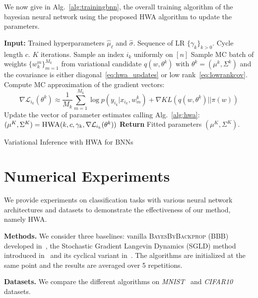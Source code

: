 \documentclass[tablecaption=bottom,wcp]{jmlr}
\begin{document}
We now give in Alg.~\ref{alg:trainingbnn}, the overall training algorithm of the bayesian neural network using the proposed HWA algorithm to update the parameters.
\begin{algorithm}[H]
\begin{algorithmic}[1]
\STATE \textbf{Input:} Trained hyperparameters $\hat{\mu}_{\ell}$ and $\hat{\sigma}$. Sequence of LR $\{\gamma_k\}_{k > 0}$. Cycle length $c$. $K$ iterations.
\STATE Sample an index $i_k$ uniformly on $[n]$
\STATE Sample MC batch of weights $\{w^m_k\}_{m=1}^{M_k}$  from variational candidate $q(w, \theta^k)$ with $\theta^k = (\mu^k, \Sigma^k)$ and the covariance is either diagonal~\eqref{eq:hwa_updates} or low rank~\eqref{eq:lowrankcov}.
\STATE Compute MC approximation of the gradient vectors:
$$ \nabla \mathcal{L}_{i_{k}}(\theta^{k}) \approx \frac{1}{M_k} \sum_{m=1}^{M_k} \log p(y_{i_k} | x_{i_k}, w^k_m)  + \nabla KL(q(w, \theta^k)||\pi(w)) $$
\STATE Update the vector of parameter estimates calling Alg.~\ref{alg:hwa}: $(\mu^K, \Sigma^K) =  \textsc{HWA}(k, c, \gamma_k, \nabla \mathcal{L}_{i_{k}}(\theta^{k}) )$
\ENDFOR
\STATE \textbf{Return} Fitted parameters $(\mu^K, \Sigma^K)$.
\end{algorithmic}
\caption{Variational Inference with HWA for BNNs}
\label{alg:trainingbnn}
\end{algorithm}

\section{Numerical Experiments}\label{sec:numerical}
We provide experiments on classification tasks with various neural network architectures and datasets to demonstrate the effectiveness of our method, namely HWA.

\vspace{0.08in}
\noindent \textbf{Methods.}\hspace{0.1in}
We consider three baselines: vanilla \textsc{BayesByBackprop} (BBB) developed in~\citep{blundell2015weight}, the Stochastic Gradient Langevin Dynamics (SGLD) method introduced in~\citep{welling2011bayesian} and its cyclical variant in~\citep{zhang2019cyclical}.
The algorithms are initialized at the same point and the results are averaged over 5 repetitions.

\vspace{0.08in}
\noindent \textbf{Datasets.}\hspace{0.1in}
We compare the different algorithms on \textit{MNIST}~\citep{lecun1998mnist} and \textit{CIFAR10}~\citep{krizhevsky2009learning} datasets.
\end{document}

